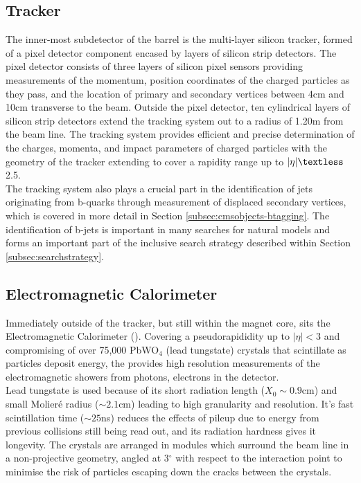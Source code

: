 \subsection{Tracker}
\label{subsec:tracker}

 The inner-most subdetector of the barrel is the multi-layer silicon tracker, formed of a pixel detector component encased by layers of silicon strip detectors. The pixel detector consists of three layers of silicon pixel sensors providing measurements of the momentum, position coordinates of the charged particles as they pass, and the location of primary and secondary vertices between 4cm and 10cm transverse to the beam. Outside the pixel detector, ten cylindrical layers of silicon strip detectors extend the tracking system out to a radius of 1.20m from the beam line. The tracking system provides efficient and precise determination of the charges, momenta, and impact parameters of charged particles with the geometry of the tracker extending to cover a rapidity range up to $\lvert\eta\rvert \textless$ 2.5.  \\
 
 The tracking system also plays a crucial part in the identification of jets originating from b-quarks through measurement of displaced secondary vertices, which is covered in more detail in Section \ref{subsec:cmsobjects-btagging}. The identification of b-jets is important in many searches for natural \SUSY models and forms an important part of the inclusive search strategy described within Section \ref{subsec:searchstrategy}.
 
\subsection{Electromagnetic Calorimeter}
\label{subsec:ecal}

 Immediately outside of the tracker, but still within the magnet core, sits the Electromagnetic Calorimeter (\ECAL). Covering a pseudorapididity up to $\lvert\eta\rvert < 3$ and compromising of over 75,000 PbWO$_{4}$ (lead tungstate) crystals that scintillate as particles deposit energy, the \ECAL provides high resolution measurements of the electromagnetic showers from photons, electrons in the detector. \\ 
 
 Lead tungstate is used because of its short radiation length ($X_{0} \sim 0.9$cm) and small Molier\'{e} radius ($\sim 2.1$cm) leading to high granularity and resolution. It's fast scintillation time ($\sim 25$ns) reduces the effects of pileup due to energy from previous collisions still being read out, and its radiation hardness gives it longevity. The crystals are arranged in modules which surround the beam line in a non-projective geometry,  angled at 3$^{\circ}$ with respect to the interaction point to minimise the risk of particles escaping down the cracks between the crystals.\\
 
